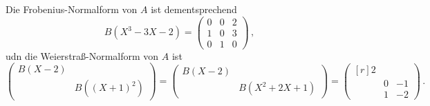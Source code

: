 Die Frobenius-Normalform von $A$ ist dementsprechend
\[
    B\left( X^3 - 3X - 2 \right)
  = \begin{pmatrix}
      0 & 0 & 2 \\
      1 & 0 & 3 \\
      0 & 1 & 0
    \end{pmatrix} \,,
\]
udn die Weierstraß-Normalform von $A$ ist
\[
    \begin{pmatrix}
      B(X-2)  &                         \\
              & B\left( (X+1)^2 \right)
    \end{pmatrix}
  = \begin{pmatrix}
      B(X-2)  &                         \\
              & B\left( X^2 + 2X + 1 \right)
    \end{pmatrix}
  = \begin{pmatrix*}[r]
      2 &   &     \\
        & 0 & -1  \\
        & 1 & -2
    \end{pmatrix*} \,.
\]




